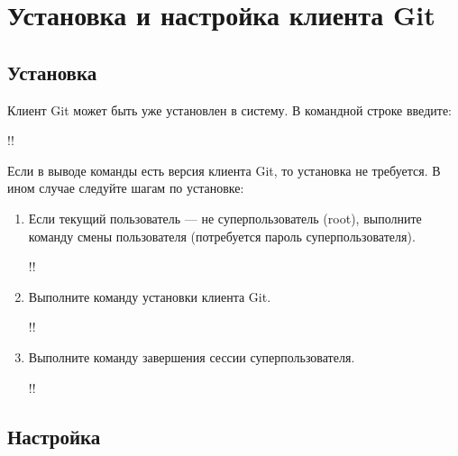 \documentclass[14pt]{extarticle}
\begin{document}
\section{Установка и настройка клиента Git}

    \subsection{Установка}

        Клиент Git может быть уже установлен в систему.
        В командной строке введите:

        \begin{terminalwindow}
!!
        \end{terminalwindow}

        Если в выводе команды есть версия клиента Git, то установка не требуется.
        В ином случае следуйте шагам по установке:

        \begin{enumerate}

            \item Если текущий пользователь --- не суперпользователь (root),
                выполните команду смены пользователя (потребуется пароль
                суперпользователя).

                \begin{terminalwindow}
!!
                \end{terminalwindow}

            \item Выполните команду установки клиента Git.

                \begin{terminalwindow}
!!
                \end{terminalwindow}

            \item Выполните команду завершения сессии суперпользователя.

                \begin{terminalwindow}
!!
                \end{terminalwindow}

        \end{enumerate}

    \subsection{Настройка}
\end{document}
